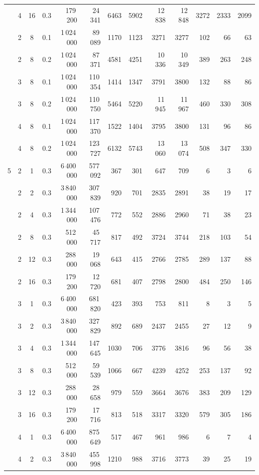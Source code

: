 \begin{tabular}{@{}ccccrrrrrrrrr@{}}
 & 4 & 16 & 0.3 & 179\,200 & 24\,341 & 6463 & 5902 & 12\,838 & 12\,848 & 3272 & 2333 & 2099 \\
 & 2 & 8 & 0.1 & 1\,024\,000 & 89\,089 & 1170 & 1123 & 3271 & 3277 & 102 & 66 & 63 \\
 & 2 & 8 & 0.2 & 1\,024\,000 & 87\,371 & 4581 & 4251 & 10\,336 & 10\,349 & 389 & 263 & 248 \\
 & 3 & 8 & 0.1 & 1\,024\,000 & 110\,354 & 1414 & 1347 & 3791 & 3800 & 132 & 88 & 86 \\
 & 3 & 8 & 0.2 & 1\,024\,000 & 110\,750 & 5464 & 5220 & 11\,945 & 11\,967 & 460 & 330 & 308 \\
 & 4 & 8 & 0.1 & 1\,024\,000 & 117\,370 & 1522 & 1404 & 3795 & 3800 & 131 & 96 & 86 \\
 & 4 & 8 & 0.2 & 1\,024\,000 & 123\,727 & 6132 & 5743 & 13\,060 & 13\,074 & 508 & 347 & 330 \\
\midrule
5 & 2 & 1 & 0.3 & 6\,400\,000 & 577\,092 & 367 & 301 & 647 & 709 & 6 & 3 & 6 \\
 & 2 & 2 & 0.3 & 3\,840\,000 & 307\,839 & 920 & 701 & 2835 & 2891 & 38 & 19 & 17 \\
 & 2 & 4 & 0.3 & 1\,344\,000 & 107\,476 & 772 & 552 & 2886 & 2960 & 71 & 38 & 23 \\
 & 2 & 8 & 0.3 & 512\,000 & 45\,717 & 817 & 492 & 3724 & 3744 & 218 & 103 & 54 \\
 & 2 & 12 & 0.3 & 288\,000 & 19\,068 & 643 & 415 & 2766 & 2785 & 289 & 137 & 88 \\
 & 2 & 16 & 0.3 & 179\,200 & 12\,720 & 681 & 407 & 2798 & 2800 & 484 & 250 & 146 \\
 & 3 & 1 & 0.3 & 6\,400\,000 & 681\,820 & 423 & 393 & 753 & 811 & 8 & 3 & 5 \\
 & 3 & 2 & 0.3 & 3\,840\,000 & 327\,829 & 892 & 689 & 2437 & 2455 & 27 & 12 & 9 \\
 & 3 & 4 & 0.3 & 1\,344\,000 & 147\,645 & 1030 & 706 & 3776 & 3816 & 96 & 56 & 38 \\
 & 3 & 8 & 0.3 & 512\,000 & 59\,539 & 1066 & 667 & 4239 & 4252 & 253 & 137 & 92 \\
 & 3 & 12 & 0.3 & 288\,000 & 28\,658 & 979 & 559 & 3664 & 3676 & 383 & 209 & 129 \\
 & 3 & 16 & 0.3 & 179\,200 & 17\,716 & 813 & 518 & 3317 & 3320 & 579 & 305 & 186 \\
 & 4 & 1 & 0.3 & 6\,400\,000 & 875\,649 & 517 & 467 & 961 & 986 & 6 & 7 & 4 \\
 & 4 & 2 & 0.3 & 3\,840\,000 & 455\,998 & 1210 & 988 & 3716 & 3773 & 39 & 25 & 19 \\

\end{tabular}

